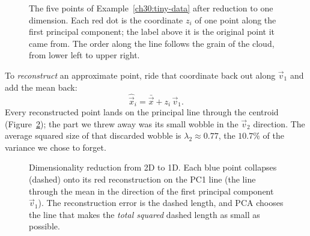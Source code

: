 \begin{figure}[htbp]
\centering
{}
\caption{The five points of Example~\ref{ch30:tiny-data} after reduction to one
dimension. Each red dot is the coordinate $z_i$ of one point along the first principal
component; the label above it is the original point it came from. The order along
the line follows the grain of the cloud, from lower left to upper right.}
\label{ch30:scores}
\end{figure}

 To \emph{reconstruct} an
approximate point, ride that coordinate back out along $\vec v_1$ and add the mean
back:
\[
  \hat{\vec x}_i=\bar{\vec x}+z_i\,\vec v_1 .
\]
Every reconstructed point lands on the principal line through the centroid
(Figure~\ref{ch30:reduce}); the part we threw away was its small wobble in the
$\vec v_2$ direction. The average squared size of that discarded wobble is
$\lambda_2\approx0.77$, the $10.7\%$ of the variance we chose to forget.

\begin{figure}[H]
\centering
{}
\caption{Dimensionality reduction from 2D to 1D. Each blue point collapses (dashed)
onto its red reconstruction on the PC1 line (the line through the mean in the
direction of the first principal component $\vec v_1$). The reconstruction error is the dashed
length, and PCA chooses the line that makes the \emph{total squared} dashed length
as small as possible.}
\label{ch30:reduce}
\end{figure}

